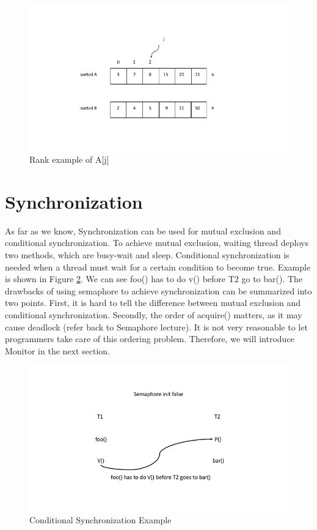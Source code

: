 \documentclass[twoside]{article}
\begin{document}
\begin{figure}[ht]
  \centering
  \includegraphics[height=0.250\textheight,width=1.0\linewidth]{./p2.jpg} 
  \caption{Rank example of A[j]}
  \label{fig:p2}
\end{figure}

\section{Synchronization}
As far as we know, Synchronization can be used for mutual exclusion and conditional synchronization. To achieve mutual exclusion, waiting thread deploys two methods, which are busy-wait and sleep. Conditional synchronization is needed when a thread must wait for a certain condition to become true. Example is shown in Figure \ref{fig:syn}. We can see foo() has to do v() before T2 go to bar(). The drawbacks of using semaphore to achieve synchronization can be summarized into two points. First, it is hard to tell the difference between mutual exclusion and conditional synchronization. Secondly, the order of acquire() matters, as it may cause deadlock (refer back to Semaphore lecture). It is not very reasonable to let programmers take care of this ordering problem. Therefore, we will introduce Monitor in the next section. 

\begin{figure}[ht]
  \centering
  \includegraphics[height=0.250\textheight,width=1.0\linewidth]{./syn.jpg} 
  \caption{Conditional Synchronization Example}
  \label{fig:syn}
\end{figure}
\end{document}
